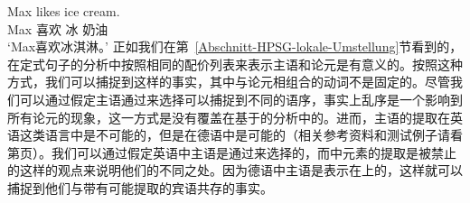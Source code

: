 \ea
\gll Max likes ice cream.\\
Max 喜欢 冰 奶油\\
\glt `Max喜欢冰淇淋。'
\z
正如我们在第~\ref{Abschnitt-HPSG-lokale-Umstellung}节看到的，在定式句子的分析中按照相同的配价列表来表示主语和论元是有意义的。按照这种方式，我们可以捕捉到这样的事实，其中与论元相组合的动词不是固定的。尽管我们可以通过假定主语通过\spr 来选择可以捕捉到不同的语序，事实上乱序是一个影响到所有论元的现象，这一方式是没有覆盖在基于\spr 的分析中的。进而，主语的提取在英语这类语言中是不可能的，但是在德语中是可能的（相关参考资料和测试例子请看第\pageref{page-extraction-out-of-subjects}页）。我们可以通过假定英语中主语是通过\spr 来选择的，而\sprl 中元素的提取是被禁止的这样的观点来说明他们的不同之处。因为德语中主语是表示在\compsl 上的，这样就可以捕捉到他们与带有可能提取的宾语共存的事实。

